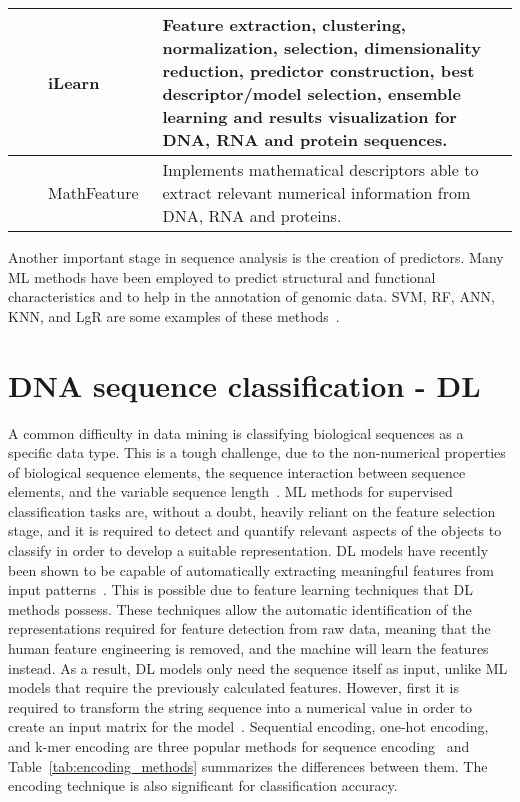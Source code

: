 \begin{table}[ht]
\begin{tabular}{lp{2cm}p{3.5cm}p{7cm}}
	\citeyear{Chen2019ILearn:Data} & \citeauthor{Chen2019ILearn:Data} & iLearn~\cite{Chen2019ILearn:Data} & Feature extraction, clustering, normalization, selection, dimensionality reduction, predictor construction, best descriptor/model selection, ensemble learning and results visualization for \gls{DNA}, \gls{RNA} and protein sequences.\\\midrule
	
	\citeyear{Bonidia2021MathFeature:Descriptors} & \citeauthor{Bonidia2021MathFeature:Descriptors} & MathFeature~\cite{Bonidia2021MathFeature:Descriptors} & Implements mathematical descriptors able to extract relevant numerical information from \gls{DNA}, \gls{RNA} and proteins.\\
    
	\bottomrule
\end{tabular}
\end{table}

Another important stage in sequence analysis is the creation of predictors. Many \gls{ML} methods have been employed to predict structural and functional characteristics and to help in the annotation of genomic data. \gls{SVM}, \gls{RF}, \gls{ANN}, \gls{KNN}, and \gls{LgR} are some examples of these methods~\cite{Chen2019ILearn:Data}.



\section{DNA sequence classification - DL}

A common difficulty in data mining is classifying biological sequences as a specific data type. This is a tough challenge, due to the non-numerical properties of biological sequence elements, the sequence interaction between sequence elements, and the variable sequence length~\cite{Yang2020ReviewDNA}. \gls{ML} methods for supervised classification tasks are, without a doubt, heavily reliant on the feature selection stage, and it is required to detect and quantify relevant aspects of the objects to classify in order to develop a suitable representation. \gls{DL} models have recently been shown to be capable of automatically extracting meaningful features from input patterns~\cite{LoBosco2017DeepClassification}. This is possible due to feature learning techniques that \gls{DL} methods possess. These techniques allow the automatic identification of the representations required for feature detection from raw data, meaning that the human feature engineering is removed, and the machine will learn the features instead. As a result, \gls{DL} models only need the sequence itself as input, unlike \gls{ML} models that require the previously calculated features. However, first it is required to transform the string sequence into a numerical value in order to create an input matrix for the model~\cite{Yang2020ReviewDNA}. Sequential encoding, one-hot encoding, and k-mer encoding are three popular methods for sequence encoding~\cite{Choong2017EvaluationMethod} and Table~\ref{tab:encoding_methods} summarizes the differences between them. The encoding technique is also significant for classification accuracy.

